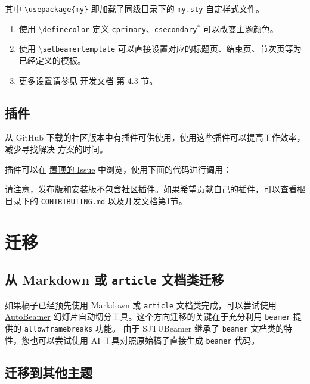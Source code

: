 \documentclass[
    UTF8,
    heading=true,
    12pt,
    a4paper
]{ctexrep}
\newenvironment{commentlist}
{\begin{enumerate}\small}
{\end{enumerate}}
\newcommand{\cmd}[1]{\textbackslash{}\texttt{#1}}
\newcommand{\cls}[1]{\texttt{#1}}
\newcommand{\opt}[1]{\texttt{#1}}
\def\themename{\textsf{SJTUBeamer}}
\begin{document}
其中 \verb"\usepackage{my}" 即加载了同级目录下的
\verb"my.sty" 自定样式文件。


\begin{commentlist}
  \item 使用 \cmd{definecolor} 定义
  \opt{cprimary}、\opt{csecondary}$^*$ 可以改变主题颜色。
  \item 使用 \cmd{setbeamertemplate}
  可以直接设置对应的标题页、结束页、节次页等为已经定义的模板。
  \item 更多设置请参见
  \href{run:sjtubeamerdevguide.pdf}{开发文档}
  第 4.3 节。
\end{commentlist}

\section{插件}

从 GitHub 下载的社区版本中有插件可供使用，使用这些插件可以提高工作效率，减少寻找解决
方案的时间。

插件可以在
\href{https://github.com/sjtug/SJTUBeamer/issues/81}
{置顶的 Issue} 中浏览，使用下面的代码进行调用：

请注意，发布版和安装版不包含社区插件。如果希望贡献自己的插件，可以查看根目录下的
\verb"CONTRIBUTING.md"
以及\href{run:sjtubeamerdevguide.pdf}{开发文档}第1节。


\chapter{迁移}

\section{从 Markdown 或 \cls{article} 文档类迁移}

如果稿子已经预先使用 Markdown 或 \cls{article} 文档类完成，可以尝试使用
\href{https://logcreative.github.io/AutoBeamer/}{AutoBeamer}
幻灯片自动切分工具。这个方向迁移的关键在于充分利用 \cls{beamer} 提供的
\opt{allowframebreaks} 功能。
由于 \themename{} 继承了 \cls{beamer} 文档类的特性，您也可以尝试使用 AI
工具对照原始稿子直接生成 \cls{beamer} 代码。

\section{迁移到其他主题}
\end{document}
